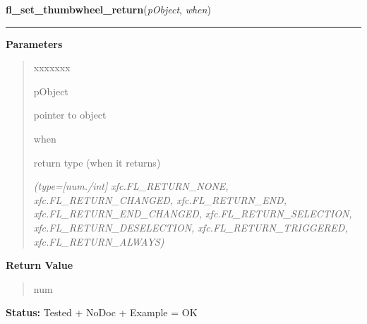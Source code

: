 \hspace{.8\funcindent}\begin{boxedminipage}{\funcwidth}

    \raggedright \textbf{fl\_set\_thumbwheel\_return}(\textit{pObject}, \textit{when})

    \vspace{-1.5ex}

    \rule{\textwidth}{0.5\fboxrule}
\setlength{\parskip}{2ex}
\setlength{\parskip}{1ex}
      \textbf{Parameters}
      \vspace{-1ex}

      \begin{quote}
        \begin{Ventry}{xxxxxxx}

          \item[pObject]

          pointer to object

          \item[when]

          return type (when it returns)

            {\it (type=[num./int] xfc.FL\_RETURN\_NONE, xfc.FL\_RETURN\_CHANGED, 
xfc.FL\_RETURN\_END, xfc.FL\_RETURN\_END\_CHANGED, 
xfc.FL\_RETURN\_SELECTION, xfc.FL\_RETURN\_DESELECTION, 
xfc.FL\_RETURN\_TRIGGERED, xfc.FL\_RETURN\_ALWAYS)}

        \end{Ventry}

      \end{quote}

      \textbf{Return Value}
    \vspace{-1ex}

      \begin{quote}
      num

      \end{quote}

\textbf{Status:} Tested + NoDoc + Example = OK



    \end{boxedminipage}

    \label{xformslib:library:fl_set_thumbwheel_crossover}

    \vspace{0.5ex}

